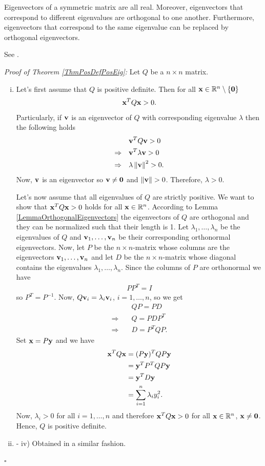 \documentclass[a4paper,12pt,twoside,BCOR=10mm]{scrbook}
\begin{document}
\begin{lemma}\label{LemmaOrthogonalEigenvectors}
Eigenvectors of a symmetric matrix are all real. Moreover, eigenvectors that correspond to different eigenvalues are orthogonal to one another. Furthermore, eigenvectors that correspond to the same eigenvalue can be replaced by orthogonal eigenvectors.
\end{lemma}

See \citep{peressini1988mathematics}.

\textit{Proof of Theorem \ref{ThmPosDefPosEig}:}
Let $Q$ be a $n \times n$ matrix.
\begin{enumerate}[i)]
    \item
    Let's first assume that $Q$ is positive definite. Then for all $\mathbf{x} \in \mathbb{R}^{n}\setminus\{\mathbf{0}\}$
\begin{align*}
    \mathbf{x}^T Q \mathbf{x} > 0.
\end{align*}
Particularly, if $\mathbf{v}$ is an eigenvector of $Q$ with corresponding eigenvalue $\lambda$ then the following holds
\begin{align*}
    &\mathbf{v}^T Q \mathbf{v} > 0\\
    \Rightarrow\quad& \mathbf{v}^T \lambda \mathbf{v} > 0\\
    \Rightarrow\quad& \lambda \left\lVert\mathbf{v}\right\rVert^2 > 0.
\end{align*}
Now, $\mathbf{v}$ is an eigenvector so $\mathbf{v} \neq \mathbf{0}$ and $\left\lVert\mathbf{v}\right\rVert > 0$. Therefore, $\lambda > 0$.

Let's now assume that all eigenvalues of $Q$ are strictly positive. We want to show that $\mathbf{x}^T Q \mathbf{x} > 0$ holds for all $\mathbf{x} \in \mathbb{R}^{n}$. According to Lemma \ref{LemmaOrthogonalEigenvectors} the eigenvectors of $Q$ are orthogonal and they can be normalized such that their length is 1. Let $\lambda_1, \ldots, \lambda_n$ be the eigenvalues of $Q$ and $\mathbf{v}_1, \ldots, \mathbf{v}_n$ be their corresponding orthonormal eigenvectors. Now, let $P$ be the $n\times n$-matrix whose columns are the eigenvectors $\mathbf{v}_1, \ldots, \mathbf{v}_n$ and let $D$ be the $n\times n$-matrix whose diagonal contains the eigenvalues $\lambda_1, \ldots, \lambda_n$. Since the columns of $P$ are orthonormal we have
\begin{align*}
    PP^T = I
\end{align*}
so $P^T = P^{-1}$. Now, $Q\mathbf{v}_i = \lambda_i \mathbf{v}_i$, $i = 1, \ldots, n$, so we get
\begin{align*}
    &QP = PD\\
    \Rightarrow\quad&Q = PDP^T\\
    \Rightarrow\quad&D = P^TQP.
\end{align*}
Set $\mathbf{x} = P\mathbf{y}$ and we have
\begin{align*}
    \mathbf{x}^T Q \mathbf{x} &= (P\mathbf{y})^TQP\mathbf{y}\\
    &= \mathbf{y}^T P^T Q P \mathbf{y}\\
    &= \mathbf{y}^T D \mathbf{y}\\
    &= \sum_{i = 1}^n \lambda_i y_i^2.
\end{align*}
Now, $\lambda_i > 0$ for all $i = 1, \ldots, n$ and therefore $\mathbf{x}^T Q \mathbf{x} > 0$ for all $\mathbf{x} \in \mathbb{R}^{n}$, $\mathbf{x} \neq \mathbf{0}$. Hence, $Q$ is positive definite.
\item - iv) Obtained in a similar fashion.
\end{enumerate}
\hfill $\square$
\end{document}
